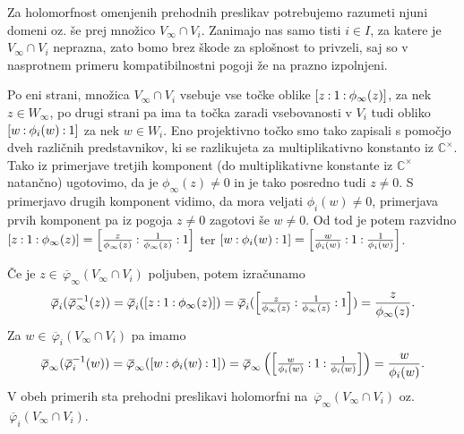 \documentclass[mat1]{fmfdelo}
\numberwithin{equation}{section}
\newcommand{\CM}{\mathbb C ^\times}
\newcommand{\inv}{^{-1}}
\newcommand{\pcoor}[1]{%
\begingroup\lccode`~=`: \lowercase{\endgroup
\edef~}{\mathbin{\mathchar\the\mathcode`:}\nobreak}%
\left[%
\begingroup
\mathcode`:=\string"8000
#1%
\endgroup
\right]%
}
\newcommand{\olsi}[1]{\,\overline{\!{#1}}} %
\theoremstyle{definition}
\begin{document}
Za holomorfnost omenjenih prehodnih preslikav potrebujemo razumeti njuni domeni oz. še prej množico $V_\infty \cap V_i$. Zanimajo nas samo tisti $i \in I$, za katere je $V_\infty \cap V_i$ neprazna, zato bomo brez škode za splošnost to privzeli, saj so v nasprotnem primeru kompatibilnostni pogoji že na prazno izpolnjeni. 

Po eni strani, množica $V_\infty \cap V_i$ vsebuje vse točke oblike $\pcoor{z : 1 : \phi_\infty(z)}$, za nek $z \in W_\infty$, po drugi strani pa ima ta točka zaradi vsebovanosti v $V_i$ tudi obliko $\pcoor{w : \phi_i(w) : 1}$ za nek $w \in W_i$. Eno projektivno točko smo tako zapisali s pomočjo dveh različnih predstavnikov, ki se razlikujeta za multiplikativno konstanto iz $\CM$. Tako iz primerjave tretjih komponent (do multiplikativne konstante iz $\CM$ natančno) ugotovimo, da je $\phi_\infty(z) \neq 0$ in je tako posredno tudi $z \neq 0$. S primerjavo drugih komponent vidimo, da mora veljati $\phi_i(w) \neq 0$, primerjava prvih komponent pa iz pogoja $z \neq 0$ zagotovi še $w \neq 0$. Od tod je potem razvidno $\pcoor{z : 1 : \phi_\infty(z)} = \pcoor{\tfrac{z}{\phi_\infty(z)} : \tfrac{1}{\phi_\infty(z)} : 1}$ ter $\pcoor{w : \phi_i(w) : 1} = \pcoor{\tfrac{w}{\phi_i(w)} : 1 : \tfrac{1}{\phi_i(w)}}$. 

Če je $z \in \olsi{\varphi}_\infty(V_\infty \cap V_i)$ poljuben, potem izračunamo 
\[
    \olsi{\varphi}_i (\olsi{\varphi}_\infty\inv (z)) = 
    \olsi{\varphi}_i (\pcoor{z : 1 : \phi_\infty(z)}) = 
    \olsi{\varphi}_i (\pcoor{\tfrac{z}{\phi_\infty(z)} : \tfrac{1}{\phi_\infty(z)} : 1}) = 
    \frac{z}{\phi_\infty(z)}.
\]
Za $w \in \olsi{\varphi}_i(V_\infty \cap V_i)$ pa imamo
\[
    \olsi{\varphi}_\infty (\olsi{\varphi}_i\inv(w)) =
    \olsi{\varphi}_\infty (\pcoor{w : \phi_i(w) : 1}) =
    \olsi{\varphi}_\infty \left(\pcoor{\tfrac{w}{\phi_i(w)} : 1 : \tfrac{1}{\phi_i(w)}}\right) =
    \frac{w}{\phi_i(w)}.
\]
V obeh primerih sta prehodni preslikavi holomorfni na $\olsi{\varphi}_\infty(V_\infty \cap V_i)$ oz. $\olsi{\varphi}_i(V_\infty \cap V_i)$.
\end{document}
